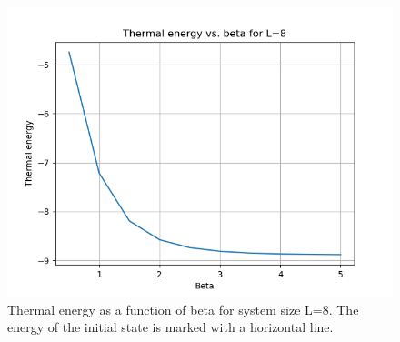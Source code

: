 \documentclass[12pt]{article}
\begin{document}
\begin{figure}
    \centering
    \includegraphics[width=\textwidth]{p4_1_2_L8.png}
    \caption{Thermal energy as a function of beta for system size L=8. The energy of the initial state is marked with a horizontal line.}
\end{figure}
\end{document}
